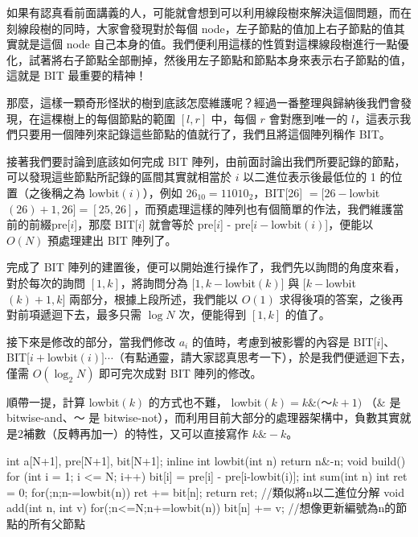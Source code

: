 \documentclass[main.tex]{subfiles}
\begin{document}
\par 如果有認真看前面講義的人，可能就會想到可以利用線段樹來解決這個問題，而在刻線段樹的同時，大家會發現對於每個 node，左子節點的值加上右子節點的值其實就是這個 node 自己本身的值。我們便利用這樣的性質對這棵線段樹進行一點優化，試著將右子節點全部刪掉，然後用左子節點和節點本身來表示右子節點的值，這就是 BIT 最重要的精神！\\

\par 那麼，這樣一顆奇形怪狀的樹到底該怎麼維護呢？經過一番整理與歸納後我們會發現，在這棵樹上的每個節點的範圍 $[l, r]$ 中，每個 $r$ 會對應到唯一的 $l$，這表示我們只要用一個陣列來記錄這些節點的值就行了，我們且將這個陣列稱作 BIT。\\

\par 接著我們要討論到底該如何完成 BIT 陣列，由前面討論出我們所要記錄的節點，可以發現這些節點所記錄的區間其實就相當於 $i$ 以二進位表示後最低位的 1 的位置（之後稱之為 lowbit$(i)$），例如 $26_{10} = 11010_{2}$，BIT[26] $= [26-$lowbit$(26)+1, 26] = [25, 26]$，而預處理這樣的陣列也有個簡單的作法，我們維護當前的前綴pre[$i$]，那麼 BIT[$i$] 就會等於 pre[$i$] - pre[$i-$lowbit$(i)$]，便能以 $O(N)$ 預處理建出 BIT 陣列了。\\

\par 完成了 BIT 陣列的建置後，便可以開始進行操作了，我們先以詢問的角度來看，對於每次的詢問 $[1, k]$，將詢問分為 $[1, k-$lowbit$(k)]$ 與 $[k-$lowbit$(k)+1, k]$ 兩部分，根據上段所述，我們能以 $O(1)$ 求得後項的答案，之後再對前項遞迴下去，最多只需 $\log{N}$ 次，便能得到 $[1, k]$ 的值了。\\

\par 接下來是修改的部分，當我們修改 $a_i$ 的值時，考慮到被影響的內容是 BIT[$i$]、BIT[$i+$lowbit$(i)]\cdots$（有點通靈，請大家認真思考一下），於是我們便遞迴下去，僅需 $O(\log_2{N})$ 即可完次成對 BIT 陣列的修改。\\

\par 順帶一提，計算 lowbit$(k)$ 的方式也不難， lowbit$(k) = k \& ($～$k + 1 )$ （$\&$ 是 bitwise-and、～ 是 bitwise-not），而利用目前大部分的處理器架構中，負數其實就是2補數（反轉再加一）的特性，又可以直接寫作 $k \& -k$。\\

\begin{C++}
int a[N+1], pre[N+1], bit[N+1];
inline int lowbit(int n) { return n&-n; }
void build() {
  for (int i = 1; i <= N; i++) 
    bit[i] = pre[i] - pre[i-lowbit(i)];
}
int sum(int n) {
	int ret = 0;
	for(;n;n-=lowbit(n)) ret += bit[n];
	return ret;
	//類似將n以二進位分解
}
void add(int n, int v) {
	for(;n<=N;n+=lowbit(n)) bit[n] += v;
	//想像更新編號為n的節點的所有父節點
}
\end{C++}
\end{document}
